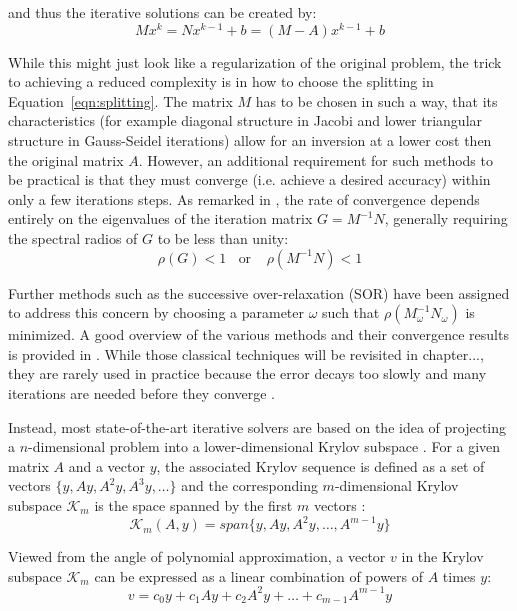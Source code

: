 \noindent and thus the iterative solutions can be created by:
\begin{equation}
    Mx^k = Nx^{k-1} +b = (M-A)x^{k-1}+b
\end{equation}

\noindent While this might just look like a regularization of the original problem, the trick to achieving a reduced complexity is in how to choose the splitting in Equation~\hyperref[eqn:splitting]{\ref{eqn:splitting}}. The matrix $M$ has to be chosen in such a way, that its characteristics (for example diagonal structure in Jacobi and lower triangular structure in Gauss-Seidel iterations) allow for an inversion at a lower cost then the original matrix $A$. However, an additional requirement for such methods to be practical is that they must converge (i.e. achieve a desired accuracy) within only a few iterations steps. As remarked in \cite{golub_matrix_2013}, the rate of convergence depends entirely on the eigenvalues of the iteration matrix $G=M^{-1}N$, generally requiring the spectral radios of $G$ to be less than unity:
\begin{equation}
    \rho(G) < 1 \;\;\text{ or }\;\;\ \rho(M^{-1}N)<1
\end{equation}

\noindent Further methods such as the successive over-relaxation (SOR) have been assigned to address this concern by choosing a parameter $\omega$ such that $\rho(M_\omega^{-1}N_\omega)$ is minimized. A good overview of the various methods and their convergence results is provided in \cite{saad_iterative_2003}. 
While those classical techniques will be revisited in chapter..., they are rarely used in practice because the error decays too slowly and many iterations are needed before they converge \cite{strang_introduction_2009}.

Instead, most state-of-the-art iterative solvers are based on the idea of projecting a $n$-dimensional problem into a lower-dimensional Krylov subspace \cite{golub_matrix_2013}. For a given matrix $A$ and a vector $y$, the associated Krylov sequence is defined as a set of vectors $\{y, Ay, A^2y, A^3y, \dots\}$ and the corresponding $m$-dimensional Krylov subspace $\mathcal{K}_m$ is the space spanned by the first $m$ vectors \cite{trefethen_numerical_1997}:
\begin{equation}
    \mathcal{K}_m(A,y) = span\{y, Ay, A^2y, \dots, A^{m-1}y\}
\end{equation}

\noindent Viewed from the angle of polynomial approximation, a vector $v$ in the Krylov subspace $\mathcal{K}_m$ can be expressed as a linear combination of powers of $A$ times $y$:
\begin{equation}
\label{eqn:poly1}
    v = c_0y+c_1Ay+c_2A^2y+\dots+c_{m-1}A^{m-1}y
\end{equation}

